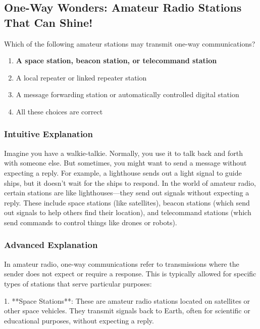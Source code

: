 \subsection{One-Way Wonders: Amateur Radio Stations That Can Shine!}

\begin{tcolorbox}[colback=gray!10!white,colframe=black!75!black,title=E1D12] Which of the following amateur stations may transmit one-way communications?
    \begin{enumerate}[label=\Alph*.]
        \item \textbf{A space station, beacon station, or telecommand station}
        \item A local repeater or linked repeater station
        \item A message forwarding station or automatically controlled digital station
        \item All these choices are correct
    \end{enumerate}
\end{tcolorbox}

\subsubsection{Intuitive Explanation}
Imagine you have a walkie-talkie. Normally, you use it to talk back and forth with someone else. But sometimes, you might want to send a message without expecting a reply. For example, a lighthouse sends out a light signal to guide ships, but it doesn't wait for the ships to respond. In the world of amateur radio, certain stations are like lighthouses—they send out signals without expecting a reply. These include space stations (like satellites), beacon stations (which send out signals to help others find their location), and telecommand stations (which send commands to control things like drones or robots).

\subsubsection{Advanced Explanation}
In amateur radio, one-way communications refer to transmissions where the sender does not expect or require a response. This is typically allowed for specific types of stations that serve particular purposes:

1. **Space Stations**: These are amateur radio stations located on satellites or other space vehicles. They transmit signals back to Earth, often for scientific or educational purposes, without expecting a reply.

